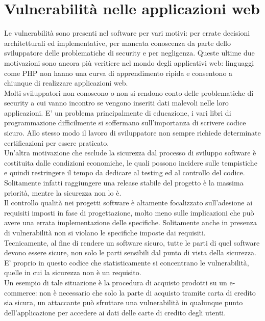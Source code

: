 \section{Vulnerabilità nelle applicazioni web}
Le vulnerabilità sono presenti nel software per vari motivi: per errate decisioni architetturali ed implementative, per mancata conoscenza da parte dello sviluppatore delle problematiche di security e per negligenza. Queste ultime due motivazioni sono ancora più veritiere nel mondo degli applicativi web: linguaggi come PHP non hanno una curva di apprendimento ripida e consentono a chiunque di realizzare applicazioni web.\\
Molti sviluppatori non conoscono o non si rendono conto delle problematiche di security a cui vanno incontro se vengono inseriti dati malevoli nelle loro applicazioni. E' un problema principalmente di educazione, i vari libri di programmazione difficilmente si soffermano sull'importanza di scrivere codice sicuro. Allo stesso modo il lavoro di sviluppatore non sempre richiede determinate certificazioni per essere praticato.\\
Un'altra motivazione che esclude la sicurezza dal processo di sviluppo software è costituita dalle condizioni economiche, le quali possono incidere sulle tempistiche e quindi restringere il tempo da dedicare al testing ed al controllo del codice. Solitamente infatti raggiungere una release stabile del progetto è la massima priorità, mentre la sicurezza non lo è.\\

Il controllo qualità nei progetti software è altamente focalizzato sull'adesione ai requisiti imposti in fase di progettazione, molto meno sulle implicazioni che può avere una errata implementazione delle specifiche. Solitamente anche in presenza di vulnerabilità non si violano le specifiche imposte dai requisiti.\\
Tecnicamente, al fine di rendere un software sicuro, tutte le parti di quel software devono essere sicure, non solo le parti sensibili dal punto di vista della sicurezza. E' proprio in questo codice che statisticamente si concentrano le vulnerabilità, quelle in cui la sicurezza non è un requisito. \\
Un esempio di tale situazione è la procedura di acquisto prodotti su un e-commerce: non è necessario che solo la parte di acquisto tramite carta di credito sia sicura, un attaccante può sfruttare una vulnerabilità in qualunque punto dell'applicazione per accedere ai dati delle carte di credito degli utenti.

